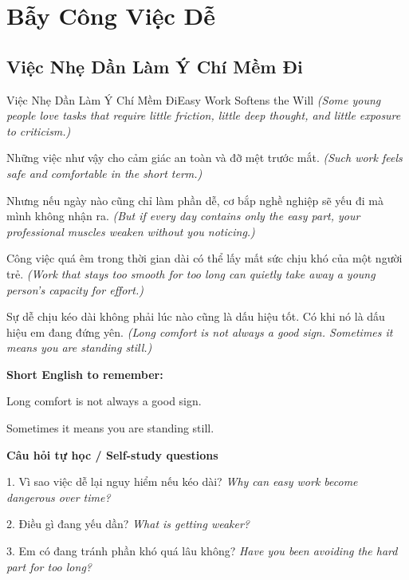 \chapter{Bẫy Công Việc Dễ}

\section{Việc Nhẹ Dần Làm Ý Chí Mềm Đi}
\begin{truyen}{Việc Nhẹ Dần Làm Ý Chí Mềm Đi}{Easy Work Softens the Will}
\textit{(Some young people love tasks that require little friction, little deep thought, and little exposure to criticism.)}

Những việc như vậy cho cảm giác an toàn và đỡ mệt trước mắt.
\textit{(Such work feels safe and comfortable in the short term.)}

Nhưng nếu ngày nào cũng chỉ làm phần dễ, cơ bắp nghề nghiệp sẽ yếu đi mà mình không nhận ra.
\textit{(But if every day contains only the easy part, your professional muscles weaken without you noticing.)}

Công việc quá êm trong thời gian dài có thể lấy mất sức chịu khó của một người trẻ.
\textit{(Work that stays too smooth for too long can quietly take away a young person’s capacity for effort.)}

\end{truyen}

\begin{baihoc}
Sự dễ chịu kéo dài không phải lúc nào cũng là dấu hiệu tốt. Có khi nó là dấu hiệu em đang đứng yên.
\textit{(Long comfort is not always a good sign. Sometimes it means you are standing still.)}
\end{baihoc}

\begin{ghinhoanh}
\textbf{Short English to remember:}

Long comfort is not always a good sign.

Sometimes it means you are standing still.

\end{ghinhoanh}

\begin{tuhocnhanh}
\textbf{Câu hỏi tự học / Self-study questions}

1. Vì sao việc dễ lại nguy hiểm nếu kéo dài? \textit{Why can easy work become dangerous over time?}

2. Điều gì đang yếu dần? \textit{What is getting weaker?}

3. Em có đang tránh phần khó quá lâu không? \textit{Have you been avoiding the hard part for too long?}
\end{tuhocnhanh}
\ngancach

